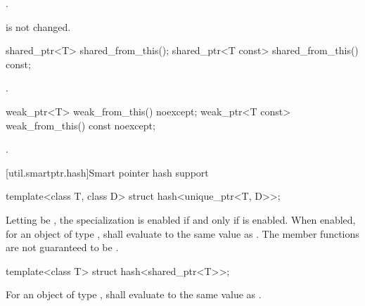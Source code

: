 \begin{itemdescr}
\pnum
\returns
{}.

\pnum
\begin{note}
 is not changed.
\end{note}
\end{itemdescr}

%
%
\begin{itemdecl}
shared_ptr<T>       shared_from_this();
shared_ptr<T const> shared_from_this() const;
\end{itemdecl}

\begin{itemdescr}
\pnum
\returns
{}.
\end{itemdescr}

%
%
\begin{itemdecl}
weak_ptr<T>       weak_from_this() noexcept;
weak_ptr<T const> weak_from_this() const noexcept;
\end{itemdecl}

\begin{itemdescr}
\pnum
\returns
{}.
\end{itemdescr}

[util.smartptr.hash]{Smart pointer hash support}

%
\begin{itemdecl}
template<class T, class D> struct hash<unique_ptr<T, D>>;
\end{itemdecl}

\begin{itemdescr}
\pnum
Letting  be ,
the specialization  is enabled
if and only if  is enabled.
When enabled, for an object  of type ,
 shall evaluate to
the same value as .
The member functions are not guaranteed to be .
\end{itemdescr}

%
\begin{itemdecl}
template<class T> struct hash<shared_ptr<T>>;
\end{itemdecl}

\begin{itemdescr}
\pnum
For an object  of type ,
 shall evaluate to
the same value as .
\end{itemdescr}%

